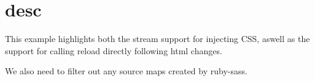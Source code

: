 \chapter{desc}
\hypertarget{md__d_1_2_g_i_t_2_food_link_2foodlink_8client_2node__modules_2bs-recipes_2recipes_2gulp_8ruby_8sass_2desc}{}\label{md__d_1_2_g_i_t_2_food_link_2foodlink_8client_2node__modules_2bs-recipes_2recipes_2gulp_8ruby_8sass_2desc}
This example highlights both the stream support for injecting CSS, aswell as the support for calling {\ttfamily reload} directly following html changes.

We also need to filter out any source maps created by ruby-\/sass. 